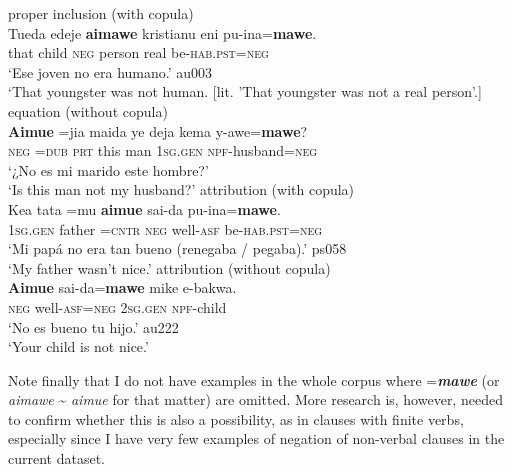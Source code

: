 \documentclass[output=paper,draft,draftmode,colorlinks,citecolor=brown]{langscibook}
\begin{document}
\begin{exe}\ex
\label{ex:tacana-inhuman-husband} \begin{xlist}
\ex\label{ex:tacana-inhuman}
proper inclusion (with copula)\\
\gll {}Tueda  edeje{\cb} \textbf{aimawe}  kristianu eni{\cb} pu-ina=\textbf{mawe}.\\
 that  child  \textsc{neg}  person  real  be-\textsc{hab.pst=neg}\\
\glt `Ese joven no era humano.' au003\\
`That youngster was not human. [lit. 'That youngster was not a real person'.]
\ex\label{ex:tacana-husband}
equation (without copula)\\
\gll  \textbf{Aimue}  =jia  maida ye  deja{\cb} kema y-awe{\cb}=\textbf{mawe}?\\
 \textsc{neg}  =\textsc{dub}  \textsc{prt}  this  man  \textsc{1sg.gen}
 \textsc{npf}-husband=\textsc{neg}\\
\glt `¿No es mi marido este hombre?'
\parencite[4]{Ottaviano1989}\\
`Is this man not my husband?' 
\newpage
\ex\label{ex:tacana-nice}  attribution (with copula)\\
\gll {}Kea tata{\cb} =mu \textbf{aimue} sai-da pu-ina=\textbf{mawe}.\\
    \textsc{1sg.gen}  father  =\textsc{cntr}  \textsc{neg}
    well\textsc{-asf}  be-\textsc{hab.pst=neg}\\
\glt `Mi papá no era tan bueno (renegaba \slash{}  pegaba).' ps058\\
`My father wasn't nice.' 
 \ex\label{ex:tacana-child}  attribution (without copula)\\
\gll 
    \textbf{Aimue} sai-da=\textbf{mawe} mike e-bakwa{\cb}.\\
    \textsc{neg}  well-\textsc{asf=neg}  \textsc{2sg.gen}
    \textsc{npf}-child\\
\glt `No es bueno tu hijo.' au222\\
`Your child is not nice.' 
\end{xlist}\end{exe}

Note finally that I do not have examples in the whole corpus where
=\textbf{\textit{mawe}} (or \textit{aimawe} {\textasciitilde}
\textit{aimue} for that matter) are omitted. More research is,
however, needed to confirm whether this is also a possibility, as in clauses
with finite verbs, especially since I have very few examples of negation of
non-verbal clauses in the current dataset.
\end{document}
